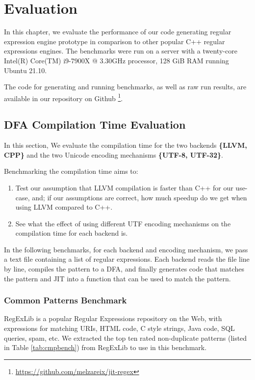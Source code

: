 \chapter{Evaluation}\label{chapter:evaluation}
In this chapter, we evaluate the performance of our code generating regular expression engine prototype in comparison to other popular C++ regular expressions engines. The benchmarks were run on a server with a twenty-core Intel(R) Core(TM) i9-7900X @ 3.30GHz processor, 128 GiB RAM running Ubuntu 21.10.

The code for generating and running benchmarks, as well as raw run results, are available in our repository on Github \footnote{\url{https://github.com/melzareix/jit-regex}}.

\newcommand\rownumberone{\stepcounter{magicrownumbers1}\arabic{magicrownumbers1}}
\newcommand\rownumbertwo{\stepcounter{magicrownumbers2}\arabic{magicrownumbers2}}
\newcommand\rownumberthree{\stepcounter{magicrownumbers3}\arabic{magicrownumbers3}}

\section{DFA Compilation Time Evaluation}
In this section, We evaluate the compilation time for the two backends \textbf{\{LLVM, CPP\}} and the two Unicode encoding mechanisms \textbf{\{UTF-8, UTF-32\}}.

Benchmarking the compilation time aims to:
\begin{enumerate}
    \item Test our assumption that LLVM compilation is faster than C++ for our use-case, and; if our assumptions are correct, how much speedup do we get when using LLVM compared to C++.
    
    \item See what the effect of using different UTF encoding mechanisms on the compilation time for each backend is.
\end{enumerate}

In the following benchmarks, for each backend and encoding mechanism, we pass a text file containing a list of regular expressions. Each backend reads the file line by line, compiles the pattern to a DFA, and finally generates code that matches the pattern and JIT into a function that can be used to match the pattern.

\subsection{Common Patterns Benchmark}\label{cmnpatt}
RegExLib \cite{regexlib} is a popular Regular Expressions repository on the Web, with expressions for matching URIs, HTML code, C style strings, Java code, SQL queries, spam, etc. We extracted the top ten rated non-duplicate patterns (listed in Table \ref{tab:cmpbench}) from RegExLib to use in this benchmark.


